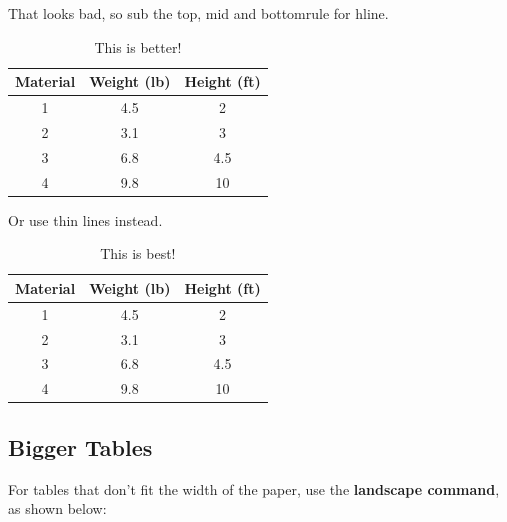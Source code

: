 \noindent That looks bad, so sub the top, mid and bottomrule for hline.

\begin{table}[htbp]
  \centering
  \caption{This is better!}
    \begin{tabular}{|c|c|c|}
    \hline
    \textbf{Material} & \textbf{Weight (lb)} & \textbf{Height (ft)} \\
    \hline
    1     & 4.5   & 2 \\
    \hline
    2     & 3.1   & 3 \\
    \hline
    3     & 6.8   & 4.5 \\
    \hline
    4     & 9.8   & 10 \\
    \hline
    \end{tabular}%
  \label{tab:table2}%
\end{table}%


\noindent Or use thin lines instead.

\begin{table}[htbp]
  \centering
  \caption{This is best!}
    \begin{tabular}{ccc}
    \toprule
    \textbf{Material} & \textbf{Weight (lb)} & \textbf{Height (ft)} \\
    \midrule
    1     & 4.5   & 2 \\
    2     & 3.1   & 3 \\
    3     & 6.8   & 4.5 \\
    4     & 9.8   & 10 \\
    \bottomrule
    \end{tabular}%
  \label{tab:table4}%
\end{table}%

\subsection{Bigger Tables}
\noindent For tables that don't fit the width of the paper, use the \textbf{landscape command}, as shown below:


